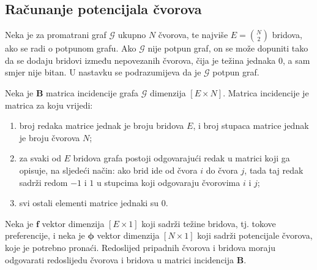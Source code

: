 \documentclass[lmodern, utf8, diplomski, numeric]{fer}
\newcommand{\matr}[1]{\mathbold{#1}}
\newcommand{\graph}[1]{\mathcal{#1}}
\newcommand{\q}{\left}
\newcommand{\w}{\right}
\begin{document}
  \subsection{Računanje potencijala čvorova}
  \label{sub:potential}
  Neka je za promatrani graf $\graph{G}$ ukupno $N$ čvorova, te najviše $E = \binom{N}{2}$ bridova, ako se radi o potpunom grafu.
  Ako $\graph{G}$ nije potpun graf, on se može dopuniti tako da se dodaju bridovi između nepovezanih čvorova, čija je težina jednaka 0, a sam smjer nije bitan.
  U nastavku se podrazumijeva da je $\graph{G}$ potpun graf.
  
  Neka je $\matr{B}$ matrica incidencije grafa $\graph{G}$ dimenzija $\q[E \times N\w]$.
  Matrica incidencije je matrica za koju vrijedi:
  \begin{enumerate}
    \item broj redaka matrice jednak je broju bridova $E$, i broj stupaca matrice jednak je broju čvorova $N$;
    \item za svaki od $E$ bridova grafa postoji odgovarajući redak u matrici koji ga opisuje, na sljedeći način: ako brid ide od čvora $i$ do čvora $j$, tada taj redak sadrži redom $-1$ i $1$ u stupcima koji odgovaraju čvorovima $i$ i $j$;
    \item svi ostali elementi matrice jednaki su 0.
  \end{enumerate}
  Neka je $\matr{f}$ vektor dimenzija $\q[E \times 1\w]$ koji sadrži težine bridova, tj. tokove preferencije,
  i neka je $\matr{\phi}$ vektor dimenzija $\q[N \times 1\w]$ koji sadrži potencijale čvorova, koje je potrebno pronaći.
  Redoslijed pripadnih čvorova i bridova moraju odgovarati redoslijedu čvorova i bridova u matrici incidencija $\matr{B}$.
  
\end{document}
